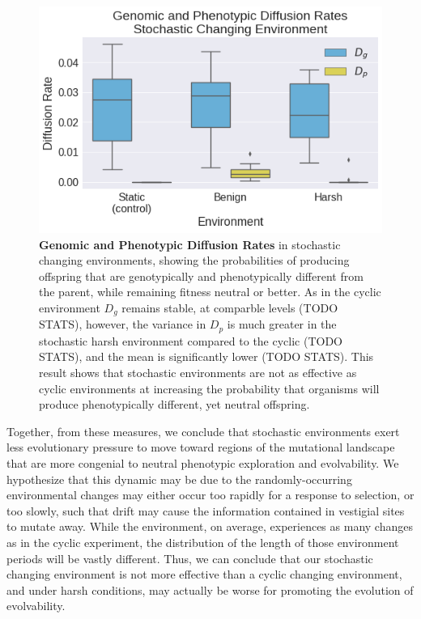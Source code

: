\documentclass[letterpaper]{article}
\begin{document}
\begin{figure}[h!] %
\begin{center}
\includegraphics[trim={0.2cm 0 0.4cm 0.25cm},clip,width=1\columnwidth]{figures/CSE_D_g_D_p__filtered__box.png}
\caption{\textbf{Genomic and Phenotypic Diffusion Rates} in stochastic changing environments, showing the probabilities of producing offspring that are genotypically and phenotypically different from the parent, while remaining fitness neutral or better. As in the cyclic environment $D_g$ remains stable, at comparble levels (TODO STATS), however, the variance in $D_p$ is much greater in the stochastic harsh environment compared to the cyclic (TODO STATS), and the mean is significantly lower (TODO STATS). This result shows that stochastic environments are not as effective as cyclic environments at increasing the probability that organisms will produce phenotypically different, yet neutral offspring.
}\label{fig:CSE_diffusion_rate}
\end{center}
\end{figure}
%
Together, from these measures, we conclude that stochastic environments exert less evolutionary pressure to move toward regions of the mutational landscape that are more congenial to neutral phenotypic exploration and evolvability. We hypothesize that this dynamic may be due to the randomly-occurring environmental changes may either occur too rapidly for a response to selection, or too slowly, such that drift may cause the information contained in vestigial sites to mutate away. While the environment, on average, experiences as many changes as in the cyclic experiment, the distribution of the length of those environment periods will be vastly different. Thus, we can conclude that our stochastic changing environment is not more effective than a cyclic changing environment, and under harsh conditions, may actually be worse for promoting the evolution of evolvability.
\end{document}
